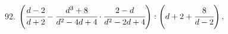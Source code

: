 92. $\left(\cfrac{d-2}{d+2}-\cfrac{d^3+8}{d^2-4d+4}\cdot\cfrac{2-d}{d^2-2d+4}\right):\left(d+2+\cfrac{8}{d-2}\right),$\\

